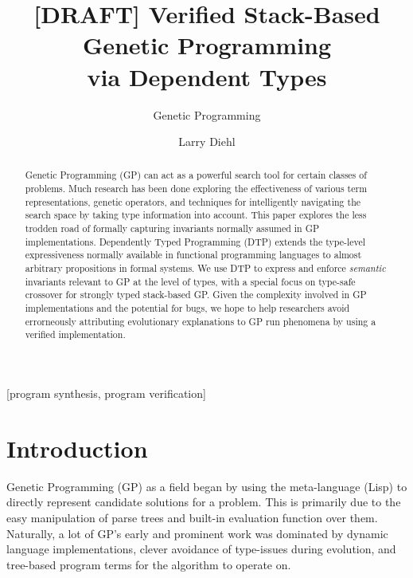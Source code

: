 \documentclass{acm_proc_article-sp}
\begin{document}
\title{[DRAFT] Verified Stack-Based Genetic Programming\\
via Dependent Types}

\subtitle{Genetic Programming}

\author{
\alignauthor Larry Diehl\\
}

\maketitle
\begin{abstract}
Genetic Programming (GP) can act as a powerful search tool for certain
classes of problems. Much research has been done exploring the
effectiveness of  various term representations, genetic operators, and
techniques for intelligently navigating the search space by taking
type information into account. This paper explores the less trodden
road of formally capturing invariants normally assumed in GP
implementations. Dependently Typed Programming (DTP) extends the
type-level expressiveness normally available in functional programming
languages to almost arbitrary propositions in formal systems. We use
DTP to express and enforce \textit{semantic} invariants relevant to GP
at the level of types, with a special focus on type-safe crossover for
strongly typed stack-based GP. Given the complexity involved in GP
implementations and the potential for bugs, we hope to help
researchers avoid errorneously attributing evolutionary explanations
to GP run phenomena by using a verified implementation. 
\end{abstract}

[program synthesis, program verification]



\section{Introduction}

Genetic Programming (GP) as a field began by using the meta-language
(Lisp) to directly represent candidate solutions for a problem. This is primarily due
to the easy manipulation of parse trees and built-in evaluation
function over them. Naturally, a lot of GP's early and prominent work
was dominated by dynamic language implementations, clever avoidance of
type-issues during evolution, and tree-based program terms
for the algorithm to operate on.
\end{document}
